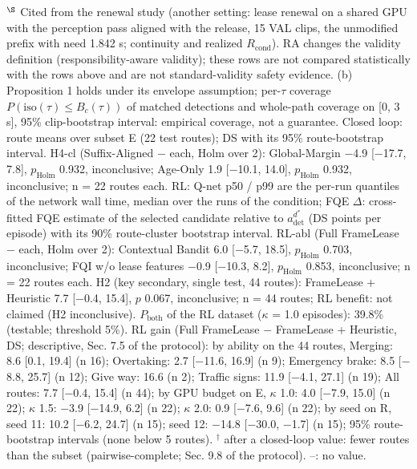 \begin{table}[t]
{$^\S$ Cited from the renewal study (another setting: lease renewal on a shared GPU with the perception pass aligned with the release, 15 VAL clips, the unmodified prefix with need 1.842 s; continuity and realized $R_\mathrm{cond}$). RA changes the validity definition (responsibility-aware validity); these rows are not compared statistically with the rows above and are not standard-validity safety evidence. 
(b) Proposition 1 holds under its envelope assumption; per-$\tau$ coverage $P(\mathrm{iso}(\tau) \le B_c(\tau))$ of matched detections and whole-path coverage on [0, 3 s], 95\% clip-bootstrap interval: empirical coverage, not a guarantee. 
Closed loop: route means over subset E (22 test routes); DS with its 95\% route-bootstrap interval. H4-cl (Suffix-Aligned $-$ each, Holm over 2): Global-Margin $-$4.9 [$-$17.7, 7.8], $p_\mathrm{Holm}$ 0.932, inconclusive; Age-Only 1.9 [$-$10.1, 14.0], $p_\mathrm{Holm}$ 0.932, inconclusive; n = 22 routes each. 
RL: Q-net p50 / p99 are the per-run quantiles of the network wall time, median over the runs of the condition; FQE $\Delta$: cross-fitted FQE estimate of the selected candidate relative to $a_\mathrm{det}^{d^*}$ (DS points per episode) with its 90\% route-cluster bootstrap interval. RL-abl (Full FrameLease $-$ each, Holm over 2): Contextual Bandit 6.0 [$-$5.7, 18.5], $p_\mathrm{Holm}$ 0.703, inconclusive; FQI w/o lease features $-$0.9 [$-$10.3, 8.2], $p_\mathrm{Holm}$ 0.853, inconclusive; n = 22 routes each. H2 (key secondary, single test, 44 routes): FrameLease + Heuristic 7.7 [$-$0.4, 15.4], $p$ 0.067, inconclusive; n = 44 routes; RL benefit: not claimed (H2 inconclusive). $P_\mathrm{both}$ of the RL dataset ($\kappa$ = 1.0 episodes): 39.8\% (testable; threshold 5\%). 
RL gain (Full FrameLease $-$ FrameLease + Heuristic, DS; descriptive, Sec. 7.5 of the protocol): by ability on the 44 routes, Merging: 8.6 [0.1, 19.4] (n 16); Overtaking: 2.7 [$-$11.6, 16.9] (n 9); Emergency brake: 8.5 [$-$8.8, 25.7] (n 12); Give way: 16.6 (n 2); Traffic signs: 11.9 [$-$4.1, 27.1] (n 19); All routes: 7.7 [$-$0.4, 15.4] (n 44); by GPU budget on E, $\kappa$ 1.0: 4.0 [$-$7.9, 15.0] (n 22); $\kappa$ 1.5: $-$3.9 [$-$14.9, 6.2] (n 22); $\kappa$ 2.0: 0.9 [$-$7.6, 9.6] (n 22); by seed on R, seed 11: 10.2 [$-$6.2, 24.7] (n 15); seed 12: $-$14.8 [$-$30.0, $-$1.7] (n 15); 95\% route-bootstrap intervals (none below 5 routes). 
$^\dagger$ after a closed-loop value: fewer routes than the subset (pairwise-complete; Sec. 9.8 of the protocol). --: no value.
}
\end{table}
